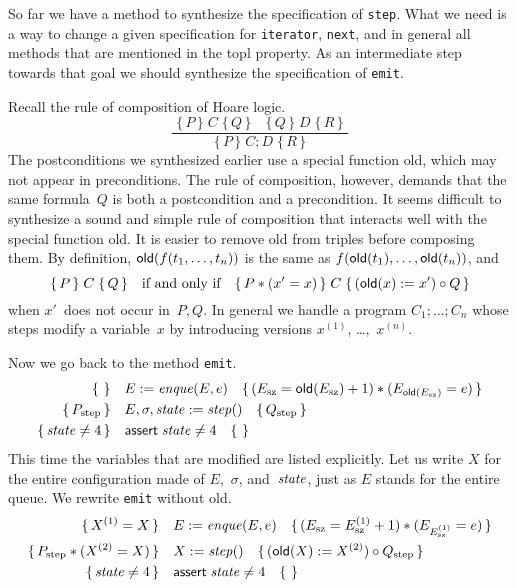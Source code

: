 \documentclass{article} %
\newcommand{\infer}[2]{\frac{\displaystyle\;#1\;}{\displaystyle\;#2\;}}
\newcommand{\3}[3]{\{\,#1\,\}\;#2\;\{\,#3\,\}}
\begin{document}
\medskip

So far we have a method to synthesize the specification of {\tt step}.
What we need is a way to change a given specification for {\tt iterator}, {\tt next}, and in general all methods that are mentioned in the topl property.
As an intermediate step towards that goal we should synthesize the specification of {\tt emit}.

Recall the rule of composition of Hoare logic.
\[\infer
  {\3{P}{C}{Q}\quad\3{Q}{D}{R}}
  {\3{P}{C;D}{R}}
\]
The postconditions we synthesized earlier use a special function {\sf old}, which may not appear in preconditions.
The rule of composition, however, demands that the same formula~$Q$ is both a postcondition and a precondition.
It seems difficult to synthesize a sound and simple rule of composition that interacts well with the special function {\sf old}.
It is easier to remove {\sf old} from triples before composing them.
By definition, ${\sf old}(f(t_1,\ldots,t_n))$ is the same as $f({\sf old}(t_1),\ldots,{\sf old}(t_n))$, and
\[
  \3{P}{C}{Q} \quad\text{if and only if}\quad
  \3{P*(x'=x)}{C}{({\sf old}(x):=x')\circ Q}
\]
when $x'$~does not occur in~$P,Q$.
In general we handle a program $C_1;\ldots;C_n$ whose steps modify a variable~$x$ by introducing versions $x^{(1)}$, \dots,~$x^{(n)}$.

Now we go back to the method {\tt emit}.
\begin{align*}
\{\,\,\}\quad&E:={\it enque}(E,e)\quad
  \{\,(E_{\rm sz}={\sf old}(E_{\rm sz})+1)*(E_{{\sf old}(E_{\rm sz})}=e)\,\}\\
\{\,P_{\rm step}\,\}\quad&E,\sigma,{\it state}:={\it step}()\quad
  \{\,Q_{\rm step}\,\} \\
\{\,{\it state}\ne4\,\}\quad&{\sf assert}\;{\it state}\ne4\quad\{\,\,\}
\end{align*}
This time the variables that are modified are listed explicitly.
Let us write $X$ for the entire configuration made of $E$,~$\sigma$, and~${\it state}$, just as $E$ stands for the entire queue.
We rewrite {\tt emit} without {\sf old}.
\begin{align*}
\{\,X^{(1)}=X\,\}
  \quad&E:={\it enque}(E,e)
  \quad\{\,(E_{\rm sz}=E^{(1)}_{\rm sz}+1)*(E_{E^{(1)}_{\rm sz}}=e)\,\} \\
\{\,P_{\rm step}*(X^{(2)}=X)\,\}
  \quad&X:={\it step}()
  \quad\{\,({\sf old}(X):=X^{(2)})\circ Q_{\rm step}\,\} \\
\{\,{\it state}\ne4\,\}\quad&{\sf assert}\;{\it state}\ne4\quad\{\,\,\}
\end{align*}
\end{document}
